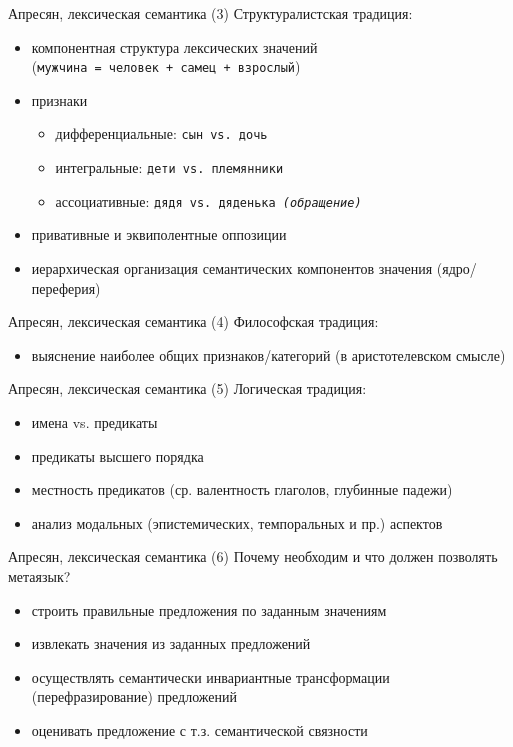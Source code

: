 \documentclass{beamer}
\begin{document}
\begin{frame}{Апресян, лексическая семантика (3)}
Структуралистская традиция:\\
\bigskip
\begin{itemize}
  \item компонентная структура лексических значений\\ {\footnotesize (\texttt{мужчина = человек + самец + взрослый})}
  \item признаки
    \begin{itemize}
      \item дифференциальные: {\footnotesize \texttt{cын vs. дочь}}
      \item интегральные: {\footnotesize \texttt{дети vs. племянники}}
      \item ассоциативные: {\footnotesize \texttt{дядя vs. дяденька \textit{(обращение)}}}
    \end{itemize}
  \item привативные и эквиполентные оппозиции
  \item иерархическая организация семантических компонентов значения (ядро/переферия)
\end{itemize}
\end{frame}

\begin{frame}{Апресян, лексическая семантика (4)}
Философская традиция:\\
\begin{itemize}
  \item выяснение наиболее общих признаков/категорий (в аристотелевском смысле)
\end{itemize}
\end{frame}

\begin{frame}{Апресян, лексическая семантика (5)}
Логическая традиция:\\
\bigskip
\begin{itemize}
  \item имена vs. предикаты
  \item предикаты высшего порядка
  \item местность предикатов (ср. валентность глаголов, глубинные падежи)
  \item анализ модальных (эпистемических, темпоральных и пр.) аспектов
\end{itemize}
\end{frame}

\begin{frame}{Апресян, лексическая семантика (6)}
Почему необходим и что должен позволять метаязык?\\
\bigskip
\begin{itemize}
  \item строить правильные предложения по заданным значениям
  \item извлекать значения из заданных предложений
  \item осуществлять семантически инвариантные трансформации (перефразирование) предложений
  \item оценивать предложение с т.з. семантической связности
\end{itemize}
\end{frame}
\end{document}
